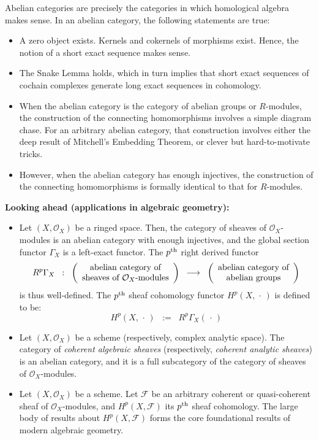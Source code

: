 Abelian categories are precisely the categories in which homological algebra makes sense.
In an abelian category, the following statements are true:
\begin{itemize}
\item
	A zero object exists.
	Kernels and cokernels of morphisms exist.
	Hence, the notion of a short exact sequence makes sense.
\item
	The Snake Lemma holds, which in turn implies that
	short exact sequences of cochain complexes generate long exact sequences in cohomology.
\item
	When the abelian category is the category of abelian groups or $R$-modules,
	the construction of the connecting homomorphisms involves a simple diagram chase.
	For an arbitrary abelian category, that construction involves either the deep result
	of Mitchell's Embedding Theorem, or clever but hard-to-motivate tricks.
\item
	However, when the abelian category has enough injectives,
	the construction of the connecting homomorphisms is formally identical to
	that for $R$-modules.
\end{itemize}
\vskip 0.5cm
\noindent
\textbf{Looking ahead (applications in algebraic geometry):}
\begin{itemize}
\item
	Let $(X,\mathcal{O}_{X})$ be a ringed space.
	Then, the category of sheaves of $\mathcal{O}_{X}$-modules
	is an abelian category with enough injectives, and
	the global section functor $\Gamma_{X}$ is a left-exact functor.
	The $p^{\textnormal{th}}$ right derived functor
	\begin{equation*}
	R^{p}\Gamma_{X}
	\;\; : \;\;
	\left(\begin{array}{c} \textnormal{abelian category of} \\ \textnormal{sheaves of $\mathcal{O}_{X}$-modules} \end{array}\right)
	\;\;\longrightarrow\;\;
	\left(\begin{array}{c} \textnormal{abelian category of} \\ \textnormal{abelian groups} \end{array}\right)
	\end{equation*}
	is thus well-defined.
	The $p^{\textnormal{th}}$ sheaf cohomology functor $H^{p}(X,\,\cdot\,)$ is defined to be:
	\begin{equation*}
	H^{p}(X,\,\cdot\,)
	\;\; := \;\;
		R^{p}\Gamma_{X}(\,\cdot\,)
	\end{equation*}
\item
	Let $(X,\mathcal{O}_{X})$ be a scheme (respectively, complex analytic space).
	The category of \textit{coherent algebraic sheaves} (respectively, \textit{coherent analytic sheaves})
	is an abelian category, and it is a full subcategory of the category of sheaves of $\mathcal{O}_{X}$-modules.
\item
	Let $(X,\mathcal{O}_{X})$ be a scheme.
	Let $\mathcal{F}$ be an arbitrary coherent or quasi-coherent sheaf of $\mathcal{O}_{X}$-modules,
	and $H^{p}(X,\mathcal{F})$ its $p^{\textnormal{th}}$ sheaf cohomology.
	The large body of results about $H^{p}(X,\mathcal{F})$ forms the core foundational results of modern algebraic geometry.
\end{itemize}

